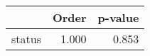\begin{table}[ht]
\centering
\begin{tabular}{rrr}
  \hline
 & Order & p-value \\ 
  \hline
status & 1.000 & 0.853 \\ 
   \hline
\end{tabular}
\end{table}

